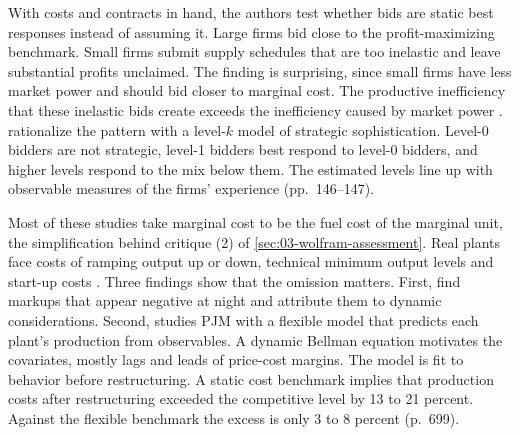 With costs and contracts in hand, the authors test whether bids are static best responses instead of assuming it.
Large firms bid close to the profit-maximizing benchmark. Small firms submit supply schedules that are too inelastic
and leave substantial profits unclaimed. The finding is surprising, since small firms have less market power and should
bid closer to marginal cost. The productive inefficiency that these inelastic bids create exceeds the inefficiency
caused by market power \citep[p.~146]{HortacsuPerrigne2021}.
\citet{HortacsuEtAl2019} rationalize the pattern with a level-$k$ model of strategic sophistication. Level-0 bidders
are not strategic, level-1 bidders best respond to level-0 bidders, and higher levels respond to the mix below them.
The estimated levels line up with observable measures of the firms' experience (pp.~146--147).

Most of these studies take marginal cost to be the fuel cost of the marginal unit, the simplification behind critique
(2) of \cref{sec:03-wolfram-assessment}. Real plants face costs of ramping output up or down, technical minimum output
levels and start-up costs \citep[p.~699]{KelloggReguant2021}. Three findings show that the omission matters. First,
\citet{BushnellMansurSaravia2008} find markups that appear negative at night and attribute them to dynamic
considerations. Second, \citet{Mansur2008} studies PJM with a flexible model that predicts each plant's production
from observables. A dynamic Bellman equation motivates the covariates, mostly lags and leads of price-cost margins.
The model is fit to behavior before restructuring. A static cost benchmark implies that production costs after
restructuring exceeded the competitive level by 13 to 21 percent. Against the flexible benchmark the excess is only 3
to 8 percent (p.~699).

